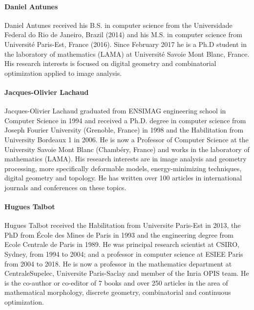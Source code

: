 

\paragraph{Daniel Antunes}
Daniel Antunes received his B.S. in computer science from the Universidade Federal do Rio de Janeiro, Brazil (2014) and his M.S. in  computer science from Universit\'e Paris-Est, France (2016). Since February 2017 he is a Ph.D student in the laboratory of mathematics (LAMA) at Universit\'e Savoie Mont Blanc, France. His research interests is focused on digital geometry and combinatorial optimization applied to image analysis.


\paragraph{Jacques-Olivier Lachaud}
Jacques-Olivier Lachaud graduated from ENSIMAG engineering school in
Computer Science in 1994 and received a Ph.D. degree in computer
science from Joseph Fourier University (Grenoble, France) in 1998 and
the Habilitation from University Bordeaux 1 in 2006. He is now a
Professor of Computer Science at the University Savoie Mont Blanc
(Chambéry, France) and works in the laboratory of mathematics
(LAMA). His research interests are in image analysis and geometry
processing, more specifically deformable models, energy-minimizing
techniques, digital geometry and topology. He has written over 100
articles in international journals and conferences on these topics.

\paragraph{Hugues Talbot}
Hugues Talbot received the Habilitation from Universite Paris-Est in
2013, the PhD from \'Ecole des Mines de Paris in 1993 and the
engineering degree from Ecole Centrale de Paris in 1989. He was
principal research scientist at CSIRO, Sydney, from 1994 to 2004; and
a professor in computer science at ESIEE Paris from 2004 to 2018. He
is now a professor in the mathematics department at CentraleSupelec,
Universite Paris-Saclay and member of the Inria OPIS team. He is the
co-author or co-editor of 7 books and over 250 articles in the area of
mathematical morphology, discrete geometry, combinatorial and
continuous optimization.

